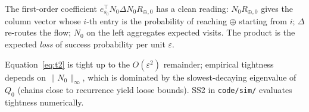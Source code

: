 \begin{remark}[Interpretation]
The first-order coefficient $e_{s_0}^\top N_0\Delta N_0 R_{\oplus,0}$ has a clean
reading: $N_0 R_{\oplus,0}$ gives the column vector whose $i$-th entry is the
probability of reaching $\oplus$ starting from $i$; $\Delta$ re-routes the flow;
$N_0$ on the left aggregates expected visits. The product is the expected
\emph{loss} of success probability per unit $\varepsilon$.
\end{remark}

\begin{remark}
Equation~\eqref{eq:t2} is tight up to the $O(\varepsilon^{2})$ remainder;
empirical tightness depends on $\|N_0\|_\infty$, which is dominated by the
slowest-decaying eigenvalue of $Q_0$ (chains close to recurrence yield loose
bounds). SS2 in \texttt{code/sim/} evaluates tightness numerically.
\end{remark}
\fi
